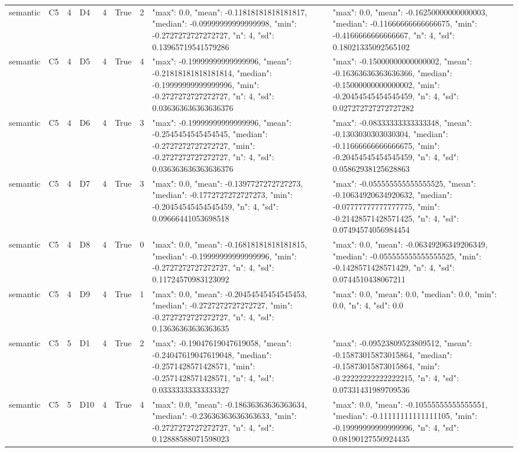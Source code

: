 \begin{tabular}{lllllllll}
semantic & C5 & 4 & D4 & 4 & True & 2 & {"max": 0.0, "mean": -0.11818181818181817, "median": -0.09999999999999998, "min": -0.2727272727272727, "n": 4, "sd": 0.13965719541579286} & {"max": 0.0, "mean": -0.16250000000000003, "median": -0.11666666666666675, "min": -0.4166666666666667, "n": 4, "sd": 0.18021335092565102} \\
semantic & C5 & 4 & D5 & 4 & True & 4 & {"max": -0.19999999999999996, "mean": -0.21818181818181814, "median": -0.19999999999999996, "min": -0.2727272727272727, "n": 4, "sd": 0.036363636363636376} & {"max": -0.15000000000000002, "mean": -0.16363636363636366, "median": -0.15000000000000002, "min": -0.20454545454545459, "n": 4, "sd": 0.027272727272727282} \\
semantic & C5 & 4 & D6 & 4 & True & 3 & {"max": -0.19999999999999996, "mean": -0.2545454545454545, "median": -0.2727272727272727, "min": -0.2727272727272727, "n": 4, "sd": 0.036363636363636376} & {"max": -0.08333333333333348, "mean": -0.1303030303030304, "median": -0.11666666666666675, "min": -0.20454545454545459, "n": 4, "sd": 0.05862938125628863} \\
semantic & C5 & 4 & D7 & 4 & True & 3 & {"max": 0.0, "mean": -0.1397727272727273, "median": -0.1772727272727273, "min": -0.20454545454545459, "n": 4, "sd": 0.09666441053698518} & {"max": -0.055555555555555525, "mean": -0.10634920634920632, "median": -0.07777777777777775, "min": -0.21428571428571425, "n": 4, "sd": 0.07494574056984454} \\
semantic & C5 & 4 & D8 & 4 & True & 0 & {"max": 0.0, "mean": -0.16818181818181815, "median": -0.19999999999999996, "min": -0.2727272727272727, "n": 4, "sd": 0.11724570983123092} & {"max": 0.0, "mean": -0.06349206349206349, "median": -0.055555555555555525, "min": -0.1428571428571429, "n": 4, "sd": 0.0744510438067211} \\
semantic & C5 & 4 & D9 & 4 & True & 1 & {"max": 0.0, "mean": -0.20454545454545453, "median": -0.2727272727272727, "min": -0.2727272727272727, "n": 4, "sd": 0.13636363636363635} & {"max": 0.0, "mean": 0.0, "median": 0.0, "min": 0.0, "n": 4, "sd": 0.0} \\
semantic & C5 & 5 & D1 & 4 & True & 2 & {"max": -0.19047619047619058, "mean": -0.24047619047619048, "median": -0.2571428571428571, "min": -0.2571428571428571, "n": 4, "sd": 0.03333333333333327} & {"max": -0.09523809523809512, "mean": -0.15873015873015864, "median": -0.15873015873015864, "min": -0.22222222222222215, "n": 4, "sd": 0.07331431989709536} \\
semantic & C5 & 5 & D10 & 4 & True & 4 & {"max": 0.0, "mean": -0.18636363636363634, "median": -0.23636363636363633, "min": -0.2727272727272727, "n": 4, "sd": 0.12888588071598023} & {"max": 0.0, "mean": -0.10555555555555551, "median": -0.11111111111111105, "min": -0.19999999999999996, "n": 4, "sd": 0.08190127550924435} \\

\end{tabular}
